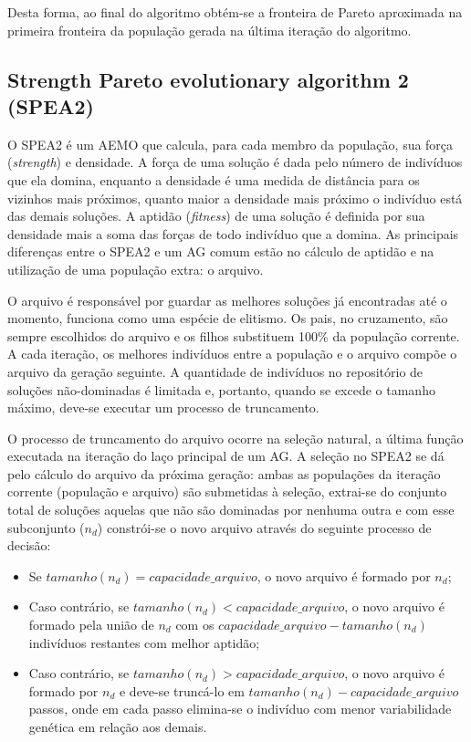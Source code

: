 Desta forma, ao final do algoritmo obtém-se a fronteira de Pareto aproximada na primeira fronteira da população gerada na última iteração do algoritmo.

\subsection{Strength Pareto evolutionary algorithm 2 (SPEA2)}

O SPEA2 \cite{Zitzler2002} é um AEMO que calcula, para cada membro da população, sua força (\textit{strength}) e densidade. A força de uma solução é dada pelo número de indivíduos que ela domina, enquanto a densidade é uma medida de distância para os vizinhos mais próximos, quanto maior a densidade mais próximo o indivíduo está das demais soluções. A aptidão (\textit{fitness}) de uma solução é definida por sua densidade mais a soma das forças de todo indivíduo que a domina. As principais diferenças entre o SPEA2 e um AG comum estão no cálculo de aptidão e na utilização de uma população extra: o arquivo.

O arquivo é responsável por guardar as melhores soluções já encontradas até o momento, funciona como uma espécie de elitismo. Os pais, no cruzamento, são sempre escolhidos do arquivo e os filhos substituem 100\% da população corrente. A cada iteração, os melhores indivíduos entre a população e o arquivo compõe o arquivo da geração seguinte. A quantidade de indivíduos no repositório de soluções não-dominadas é limitada e, portanto, quando se excede o tamanho máximo, deve-se executar um processo de truncamento.

O processo de truncamento do arquivo ocorre na seleção natural, a última função executada na iteração do laço principal de um AG. A seleção no SPEA2 se dá pelo cálculo do arquivo da próxima geração: ambas as populações da iteração corrente (população e arquivo) são submetidas à seleção, extrai-se do conjunto total de soluções aquelas que não são dominadas por nenhuma outra e com esse subconjunto ($n_d$) constrói-se o novo arquivo através do seguinte processo de decisão:

\begin{itemize}  
	\item Se $tamanho(n_d) = capacidade\_arquivo$, o novo arquivo é formado por $n_d$;
	\item Caso contrário, se $tamanho(n_d) < capacidade\_arquivo$, o novo arquivo é formado pela união de $n_d$ com os $capacidade\_arquivo - tamanho(n_d)$ indivíduos restantes com melhor aptidão;
	\item Caso contrário, se $tamanho(n_d) > capacidade\_arquivo$, o novo arquivo é formado por $n_d$ e deve-se truncá-lo em $tamanho(n_d) - capacidade\_arquivo$ passos, onde em cada passo elimina-se o indivíduo com menor variabilidade genética em relação aos demais.
\end{itemize}

